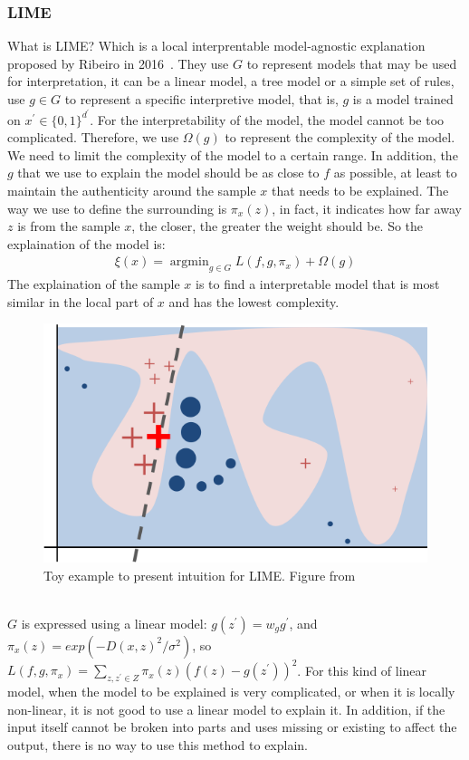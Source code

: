 \subsubsection{LIME}
What is LIME? Which is a local interprentable model-agnostic explanation proposed by Ribeiro in 2016~\cite{ribeiro2016i}. They use $G$ to represent models that may be used for interpretation, it can be a linear model, a tree model or a simple set of rules, use $g \in G$ to represent a specific interpretive model, that is, $g$ is a model trained on $x^{\prime} \in \lbrace 0,1 \rbrace ^{d^\prime}$. For the interpretability of the model, the model cannot be too complicated. Therefore, we use $\Omega(g)$ to represent the complexity of the model. We need to limit the complexity of the model to a certain range. In addition, the $g$ that we use to explain the model should be as close to $f$ as possible, at least to maintain the authenticity around the sample $x$ that needs to be explained. The way we use to define the surrounding is $\pi_x(z)$, in fact, it indicates how far away $z$ is from the sample $x$, the closer, the greater the weight should be. So the explaination of the model is:
\begin{equation}
\begin{aligned}
\xi(x) = \mathop {argmin}_{g\in G} L(f, g, \pi_x) + \Omega(g)
\end{aligned}
\label{eqn:eq1}
\end{equation}
The explaination of the sample $x$ is to find a interpretable model that is most similar in the local part of $x$ and has the lowest complexity.

\begin{figure}[H]
\centering
\includegraphics[width=0.5\columnwidth]{master_thesis/gfx/lime.png}
\caption{Toy example to present intuition for LIME. Figure from~\cite{ribeiro2016i}}
\label{fig:lime}
\end{figure}

~\\$G$ is expressed using a linear model: $g(z^\prime) = w_g g^\prime$, and $\pi_x(z) = exp(-D(x, z)^2/\sigma^2)$, so $L(f,g,\pi_x)=\sum_{z,z^\prime \in Z}\pi_x(z)(f(z) - g(z^\prime))^2$.
For this kind of linear model, when the model to be explained is very complicated, or when it is locally non-linear, it is not good to use a linear model to explain it. In addition, if the input itself cannot be broken into parts and uses missing or existing to affect the output, there is no way to use this method to explain.
